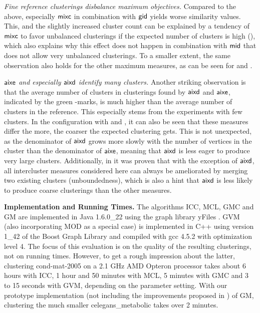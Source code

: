 \documentclass{llncs}
\newcommand{\measure}[1]{\ensuremath{\text{\normalfont{\sffamily {#1}}}}\xspace}
\newcommand{\andreapar}{\vspace*{.5ex}\par\noindent}
\begin{document}
\par\emph{Fine reference clusterings disbalance maximum objectives.}
Compared to the above,
especially \measure{mixc} in combination with \measure{gid} yields worse similarity values.
This, and the slightly increased cluster count can be explained by a tendency of \measure{mixc} to favor unbalanced clusterings if the expected number of clusters is high (), which also explains why this effect does not happen in combination with \measure{mid} that does not allow very unbalanced clusterings.
To a smaller extent, the same observation also holds for the other maximum measures, 
as can be seen for  and .
\par\emph{\measure{aixe} and especially \measure{aixd} identify many clusters.}
Another striking observation is that the average number of clusters in clusterings found by \measure{aixd} and \measure{aixe}, indicated by the green -marks, is much higher than the average number of clusters in the reference.
This especially stems from the experiments with few clusters.
In the configuration with  and , it can also be seen that these measures differ the more, the coarser the expected clustering gets.
This is not unexpected, as the denominator of \measure{aixd} grows more slowly with the number of vertices in the cluster than the denominator of \measure{aixe}, meaning that \measure{aixd} is less eager to produce very large clusters.
Additionally, in \cite{gsw-dcgc-11b} it was proven that with the exception of \measure{aixd}, all intercluster measures considered here can always be ameliorated by merging two existing clusters (unboundedness), which is also a hint that \measure{aixd} is less likely to produce coarse clusterings than the other measures.
\andreapar\textbf{Implementation and Running Times.}
The algorithms ICC, MCL, GMC and GM are implemented in Java 1.6.0\_22 using the graph library yFiles \cite{yfiles}.
GVM (also incorporating MOD as a special case) is implemented in C++ using version 1\_42 of the Boost Graph Library \cite{boost} and compiled with gcc 4.5.2 with optimization level 4.
The focus of this evaluation is on the quality of the resulting clusterings, not on running times.
However, to get a rough impression about the latter, clustering cond-mat-2005 on a 2.1 GHz AMD Opteron processor takes about 6 hours with ICC, 1 hour and 50 minutes with MCL, 5 minutes with GMC and 3 to 15 seconds with GVM, depending on the parameter setting.
With our prototype implementation (not including the improvements proposed in \cite{gsw-dcgc-11b}) of GM, clustering the much smaller celegans\_metabolic takes over 2 minutes.
\end{document}
